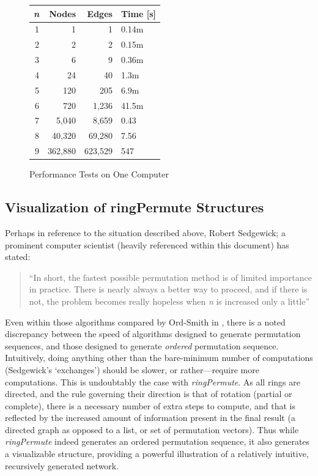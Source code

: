 \documentclass[12pt]{article}
\begin{document}
\begin{figure}[ht]
\centering
\hspace{1cm}
\begin{tabular}{| r | r | r | l |}
	\hline
	\emph{n} & Nodes & Edges & Time [s]\\
	\hline \hline
	1 & 1 & 1 & 0.14m \\
	2 & 2 & 2 & 0.15m \\
	3 & 6 & 9 & 0.36m \\
	4 & 24 & 40 & 1.3m \\
	5 & 120 & 205 & 6.9m \\
	6 & 720 & 1,236 & 41.5m \\
	7 & 5,040 & 8,659 & 0.43 \\
	8 & 40,320 & 69,280 & 7.56 \\
	9 & 362,880 & 623,529 & 547 \\
	\hline
\end{tabular}
\caption{Performance Tests on One Computer}
\label{Performance Table}
\end{figure}

\newpage

\subsection{Visualization of ringPermute Structures}
Perhaps in reference to the situation described above, Robert Sedgewick; a prominent computer scientist (heavily referenced within this document) has stated:\\

\begin{quote}
``In short, the fastest possible permutation method is of limited importance in practice. There is nearly always a better way to proceed, and if there is not, the problem becomes really hopeless when \emph{n} is increased only a little''\cite{Sedgewick:1977}\\
\end{quote}

Even within those algorithms compared by Ord-Smith in \cite{Ord-Smith:1970,Ord-Smith:1971}, there is a noted discrepancy between the speed of algorithms designed to generate permutation sequences, and those designed to generate \emph{ordered} permutation sequence.
\pagebreak[1] Intuitively, doing anything other than the bare-minimum number of computations (Sedgewick's `exchanges') should be slower, or rather---require more computations.
This is undoubtably the case with \emph{ringPermute}.
As all rings are directed, and the rule governing their direction is that of rotation (partial or complete), there is a necessary number of extra steps to compute, and that is  reflected by the increased amount of information present in the final result (a directed graph as opposed to a list, or set of permutation vectors).
\pagebreak[2] Thus while \emph{ringPermute} indeed generates an ordered permutation sequence, it also generates a visualizable structure, providing a powerful illustration of a relatively intuitive, recursively generated network.\pagebreak[2]\\
\end{document}
